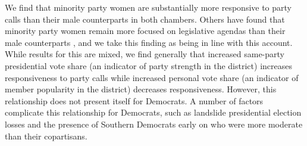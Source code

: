 \documentclass[12pt]{article}
\begin{document}
We find that minority party women are substantially more responsive to party calls than their male counterparts in both chambers. Others have found that minority party women remain more focused on legislative agendas than their male counterparts \cite{Volden:2013}, and we take this finding as being in line with this account. While results for this are mixed, we find generally that increased same-party presidential vote share (an indicator of party strength in the district) increases responsiveness to party calls while increased personal vote share (an indicator of member popularity in the district) decreases responsiveness. However, this relationship does not present itself for Democrats. A number of factors complicate this relationship for Democrats, such as landslide presidential election losses and the presence of Southern Democrats early on who were more moderate than their copartisans.
\end{document}
